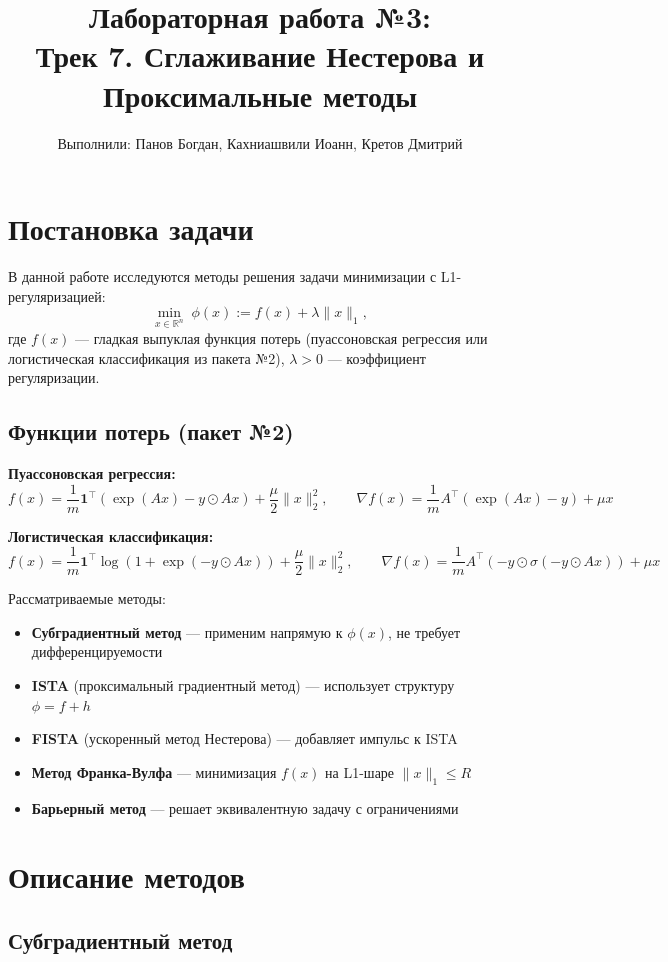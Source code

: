 \documentclass[a4paper,12pt]{article}
\title{\textbf{Лабораторная работа №3}:\\
Трек 7. Сглаживание Нестерова и Проксимальные методы}
\author{Выполнили: Панов Богдан, Кахниашвили Иоанн, Кретов Дмитрий}
\begin{document}
\maketitle
\newpage

\section*{Постановка задачи}

В данной работе исследуются методы решения задачи минимизации с L1-регуляризацией:
\[
\min_{x \in \mathbb{R}^n} \; \phi(x) := f(x) + \lambda \|x\|_1,
\]
где $f(x)$ — гладкая выпуклая функция потерь (пуассоновская регрессия или логистическая классификация из пакета №2), $\lambda > 0$ — коэффициент регуляризации.

\subsection*{Функции потерь (пакет №2)}

\textbf{Пуассоновская регрессия:}
\[
f(x) = \frac{1}{m}\mathbf{1}^\top(\exp(Ax) - y \odot Ax) + \frac{\mu}{2}\|x\|_2^2, \qquad
\nabla f(x) = \frac{1}{m}A^\top(\exp(Ax) - y) + \mu x
\]

\textbf{Логистическая классификация:}
\[
f(x) = \frac{1}{m}\mathbf{1}^\top\log(1 + \exp(-y \odot Ax)) + \frac{\mu}{2}\|x\|_2^2, \qquad
\nabla f(x) = \frac{1}{m}A^\top(-y \odot \sigma(-y \odot Ax)) + \mu x
\]

Рассматриваемые методы:
\begin{itemize}
    \item \textbf{Субградиентный метод} — применим напрямую к $\phi(x)$, не требует дифференцируемости
    \item \textbf{ISTA} (проксимальный градиентный метод) — использует структуру $\phi = f + h$
    \item \textbf{FISTA} (ускоренный метод Нестерова) — добавляет импульс к ISTA
    \item \textbf{Метод Франка-Вулфа} — минимизация $f(x)$ на L1-шаре $\|x\|_1 \le R$
    \item \textbf{Барьерный метод} — решает эквивалентную задачу с ограничениями
\end{itemize}

\section*{Описание методов}

\subsection*{Субградиентный метод}
\end{document}
